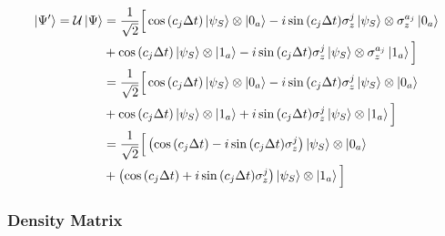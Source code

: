 \documentclass[a4paper,12pt]{article}
\begin{document}
	\begin{align}
		\ket{\Psi'} = \mathcal{U} \ket{\Psi}
		&= \frac{1}{\sqrt{2}} \Big[ \cos{\left(c_j \Delta t\right)} \ket{\psi_{S}} \otimes \ket{0_a} - i\sin{\left(c_j \Delta t \right)} \sigma_{z}^{j} \ket{\psi_{S}} \otimes \sigma_{z}^{a_j}\ket{0_a} \notag \\
		& + \cos{\left(c_j \Delta t\right)} \ket{\psi_{S}} \otimes \ket{1_a} - i\sin{\left(c_j \Delta t \right)} \sigma_{z}^{j} \ket{\psi_{S}} \otimes \sigma_{z}^{a_j}\ket{1_a} \Big] \notag \\
		&= \frac{1}{\sqrt{2}} \Big[ \cos{\left(c_j \Delta t\right)} \ket{\psi_{S}} \otimes \ket{0_a} - i\sin{\left(c_j \Delta t \right)} \sigma_{z}^{j} \ket{\psi_{S}} \otimes \ket{0_a} \notag \\
		& + \cos{\left(c_j \Delta t\right)} \ket{\psi_{S}} \otimes \ket{1_a} + i\sin{\left(c_j \Delta t \right)} \sigma_{z}^{j} \ket{\psi_{S}} \otimes \ket{1_a} \Big] \notag \\
		&= \frac{1}{\sqrt{2}} \Big[ \left( \cos{\left(c_j \Delta t\right)} - i\sin{\left(c_j \Delta t \right)} \sigma_{z}^{j}\right) \ket{\psi_{S}} \otimes \ket{0_a}  \notag \\
		& + \left( \cos{\left(c_j \Delta t\right)} + i\sin{\left(c_j \Delta t \right)}  \sigma_{z}^{j}\right) \ket{\psi_{S}} \otimes \ket{1_a}  \Big]
		\label{eq:psi_evo_cohe}
	\end{align}

	\subsubsection{Density Matrix}
	\label{sub:Density_Matrix_Reconstruction_cohe}
\end{document}
